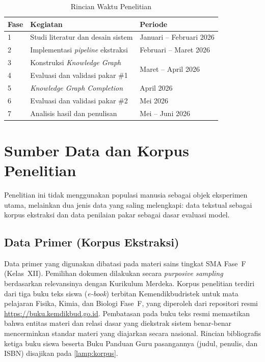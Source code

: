 \documentclass[../../thesis]{subfiles}
\begin{document}
\begin{table}[htbp]
\centering
\caption{Rincian Waktu Penelitian}
\label{tab:waktu}
\begin{tabular}{@{}lll@{}}
  \toprule
  \textbf{Fase} & \textbf{Kegiatan} & \textbf{Periode} \\
  \midrule
  1 & Studi literatur dan desain sistem
    & Januari -- Februari 2026 \\
  2 & Implementasi \textit{pipeline} ekstraksi
    & Februari -- Maret 2026 \\
  3 & Konstruksi \textit{Knowledge Graph}
    & \multirow{2}{*}{Maret -- April 2026} \\
  4 & Evaluasi dan validasi pakar \#1 & \\
  5 & \textit{Knowledge Graph Completion}
    & April 2026 \\
  6 & Evaluasi dan validasi pakar \#2
    & Mei 2026 \\
  7 & Analisis hasil dan penulisan
    & Mei -- Juni 2026 \\
\end{tabular}
\end{table}

\section{Sumber Data dan Korpus Penelitian}

Penelitian ini tidak menggunakan populasi manusia sebagai objek
eksperimen utama, melainkan dua jenis data yang saling melengkapi: data
tekstual sebagai korpus ekstraksi dan data penilaian pakar sebagai dasar
evaluasi model.

\subsection{Data Primer (Korpus Ekstraksi)}\label{subsec:data-primer}

Data primer yang digunakan dibatasi pada materi sains tingkat SMA
Fase~F (Kelas~XII). Pemilihan dokumen dilakukan secara
\textit{purposive sampling} berdasarkan relevansinya dengan Kurikulum
Merdeka. Korpus penelitian terdiri dari tiga buku teks siswa
(\textit{e-book}) terbitan Kemendikbudristek untuk mata pelajaran Fisika,
Kimia, dan Biologi Fase~F, yang diperoleh dari repositori resmi
\url{https://buku.kemdikbud.go.id}. Pembatasan pada buku teks resmi
memastikan bahwa entitas materi dan relasi dasar yang diekstrak sistem
benar-benar mencerminkan standar materi yang diajarkan secara nasional.
Rincian bibliografis ketiga buku siswa beserta Buku Panduan Guru
pasangannya (judul, penulis, dan ISBN) disajikan pada \ref{lamp:korpus}.
\end{document}

